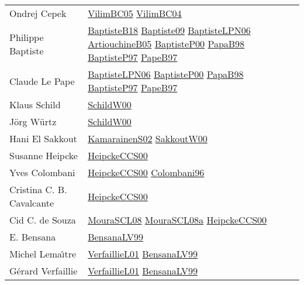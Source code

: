{\begin{longtable}{p{4cm}p{15cm}}
Ondrej Cepek & \href{articles/VilimBC05.pdf}{VilimBC05}\cite{VilimBC05} \href{papers/VilimBC04.pdf}{VilimBC04}\cite{VilimBC04} \\
Philippe Baptiste & \href{articles/BaptisteB18.pdf}{BaptisteB18}\cite{BaptisteB18} \href{papers/Baptiste09.pdf}{Baptiste09}\cite{Baptiste09} \href{}{BaptisteLPN06}\cite{BaptisteLPN06} \href{papers/ArtiouchineB05.pdf}{ArtiouchineB05}\cite{ArtiouchineB05} \href{articles/BaptisteP00.pdf}{BaptisteP00}\cite{BaptisteP00} \href{articles/PapaB98.pdf}{PapaB98}\cite{PapaB98} \href{papers/BaptisteP97.pdf}{BaptisteP97}\cite{BaptisteP97} \href{papers/PapeB97.pdf}{PapeB97}\cite{PapeB97} \\
Claude Le Pape & \href{}{BaptisteLPN06}\cite{BaptisteLPN06} \href{articles/BaptisteP00.pdf}{BaptisteP00}\cite{BaptisteP00} \href{articles/PapaB98.pdf}{PapaB98}\cite{PapaB98} \href{papers/BaptisteP97.pdf}{BaptisteP97}\cite{BaptisteP97} \href{papers/PapeB97.pdf}{PapeB97}\cite{PapeB97} \\
Klaus Schild & \href{articles/SchildW00.pdf}{SchildW00}\cite{SchildW00} \\
J{\"{o}}rg W{\"{u}}rtz & \href{articles/SchildW00.pdf}{SchildW00}\cite{SchildW00} \\
Hani El Sakkout & \href{papers/KamarainenS02.pdf}{KamarainenS02}\cite{KamarainenS02} \href{articles/SakkoutW00.pdf}{SakkoutW00}\cite{SakkoutW00} \\
Susanne Heipcke & \href{articles/HeipckeCCS00.pdf}{HeipckeCCS00}\cite{HeipckeCCS00} \\
Yves Colombani & \href{articles/HeipckeCCS00.pdf}{HeipckeCCS00}\cite{HeipckeCCS00} \href{papers/Colombani96.pdf}{Colombani96}\cite{Colombani96} \\
Cristina C. B. Cavalcante & \href{articles/HeipckeCCS00.pdf}{HeipckeCCS00}\cite{HeipckeCCS00} \\
Cid C. de Souza & \href{papers/MouraSCL08.pdf}{MouraSCL08}\cite{MouraSCL08} \href{papers/MouraSCL08a.pdf}{MouraSCL08a}\cite{MouraSCL08a} \href{articles/HeipckeCCS00.pdf}{HeipckeCCS00}\cite{HeipckeCCS00} \\
E. Bensana & \href{articles/BensanaLV99.pdf}{BensanaLV99}\cite{BensanaLV99} \\
Michel Lema{\^{\i}}tre & \href{papers/VerfaillieL01.pdf}{VerfaillieL01}\cite{VerfaillieL01} \href{articles/BensanaLV99.pdf}{BensanaLV99}\cite{BensanaLV99} \\
G{\'{e}}rard Verfaillie & \href{papers/VerfaillieL01.pdf}{VerfaillieL01}\cite{VerfaillieL01} \href{articles/BensanaLV99.pdf}{BensanaLV99}\cite{BensanaLV99} \\

\end{longtable}}

